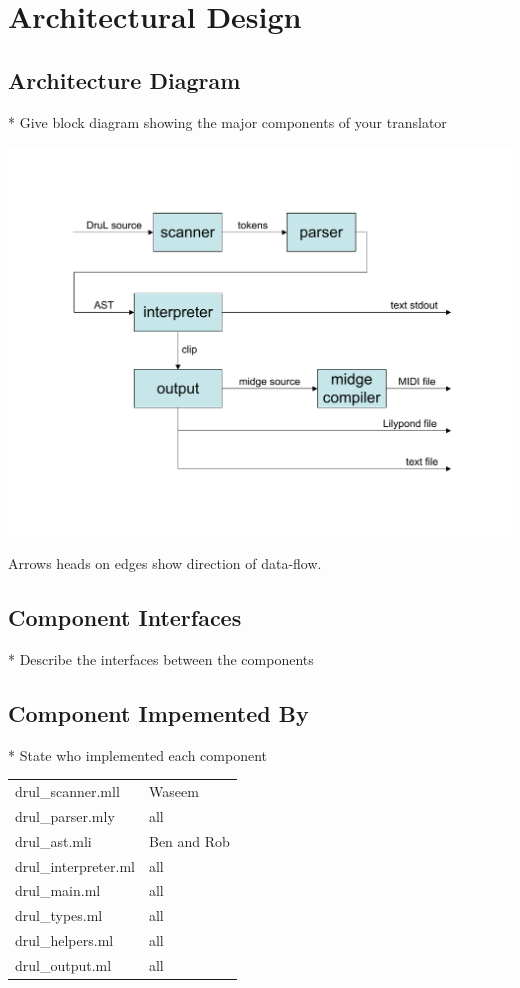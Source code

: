 
\chapter{Architectural Design}

\section{Architecture Diagram}
* Give block diagram showing the major components of your translator

\includegraphics[width=150mm]{Architecture_diagram.pdf}

Arrows heads on edges show direction of data-flow.

\section{Component Interfaces}
* Describe the interfaces between the components

\section{Component Impemented By}
* State who implemented each component

\begin{tabular}{ | l | l | } \hline

	drul\_scanner.mll    & Waseem      \\
	drul\_parser.mly     & all         \\
	drul\_ast.mli        & Ben and Rob \\
	drul\_interpreter.ml & all         \\
	drul\_main.ml        & all         \\
	drul\_types.ml       & all         \\
	drul\_helpers.ml     & all         \\
	drul\_output.ml      & all         \\

\end{tabular}
